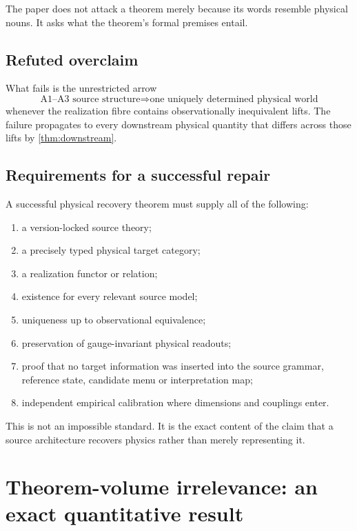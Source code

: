 \documentclass[10pt,a4paper]{article}
\theoremstyle{definition}
\theoremstyle{remark}
\begin{document}
The paper does not attack a theorem merely because its words resemble physical
nouns.  It asks what the theorem's formal premises entail.

\subsection{Refuted overclaim}

What fails is the unrestricted arrow
\[
\boxed{
\text{A1--A3 source structure}
\Longrightarrow
\text{one uniquely determined physical world}
}
\]
whenever the realization fibre contains observationally inequivalent lifts.
The failure propagates to every downstream physical quantity that differs
across those lifts by \cref{thm:downstream}.

\subsection{Requirements for a successful repair}

A successful physical recovery theorem must supply all of the following:

\begin{enumerate}
\item a version-locked source theory;
\item a precisely typed physical target category;
\item a realization functor or relation;
\item existence for every relevant source model;
\item uniqueness up to observational equivalence;
\item preservation of gauge-invariant physical readouts;
\item proof that no target information was inserted into the source grammar,
reference state, candidate menu or interpretation map;
\item independent empirical calibration where dimensions and couplings enter.
\end{enumerate}

This is not an impossible standard.  It is the exact content of the claim that
a source architecture recovers physics rather than merely representing it.


\section{Theorem-volume irrelevance: an exact quantitative result}
\label{sec:volume}
\end{document}

